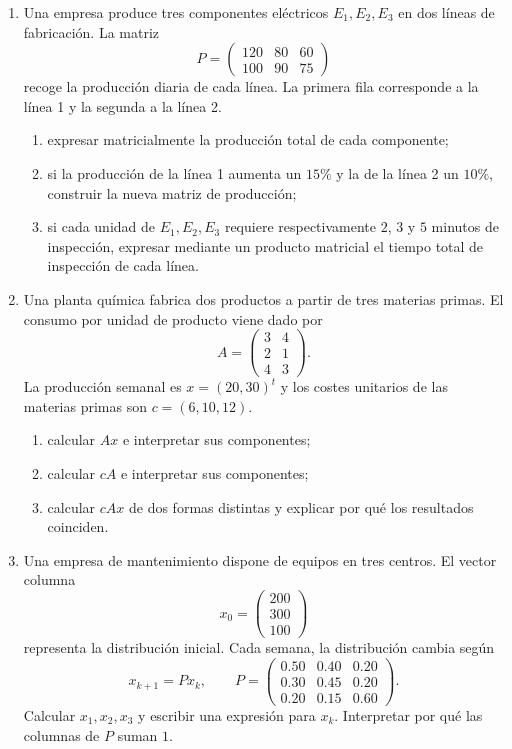 \begin{enumerate}[label=\textbf{\arabic*.},leftmargin=*]
\item Una empresa produce tres componentes eléctricos $E_1,E_2,E_3$ en dos líneas de fabricación. La matriz
\[
P=\begin{pmatrix}
120&80&60\\
100&90&75
\end{pmatrix}
\]
recoge la producción diaria de cada línea. La primera fila corresponde a la línea 1 y la segunda a la línea 2.
\begin{enumerate}[label=\alph*)]
\item expresar matricialmente la producción total de cada componente;
\item si la producción de la línea 1 aumenta un $15\%$ y la de la línea 2 un $10\%$, construir la nueva matriz de producción;
\item si cada unidad de $E_1,E_2,E_3$ requiere respectivamente $2$, $3$ y $5$ minutos de inspección, expresar mediante un producto matricial el tiempo total de inspección de cada línea.
\end{enumerate}

\item Una planta química fabrica dos productos a partir de tres materias primas. El consumo por unidad de producto viene dado por
\[
A=\begin{pmatrix}3&4\\2&1\\4&3\end{pmatrix}.
\]
La producción semanal es $x=(20,30)^t$ y los costes unitarios de las materias primas son $c=(6,10,12)$.
\begin{enumerate}[label=\alph*)]
\item calcular $Ax$ e interpretar sus componentes;
\item calcular $cA$ e interpretar sus componentes;
\item calcular $cAx$ de dos formas distintas y explicar por qué los resultados coinciden.
\end{enumerate}

\item Una empresa de mantenimiento dispone de equipos en tres centros. El vector columna
\[
x_0=\begin{pmatrix}200\\300\\100\end{pmatrix}
\]
representa la distribución inicial. Cada semana, la distribución cambia según
\[
x_{k+1}=Px_k,
\qquad
P=\begin{pmatrix}
0.50&0.40&0.20\\
0.30&0.45&0.20\\
0.20&0.15&0.60
\end{pmatrix}.
\]
Calcular $x_1,x_2,x_3$ y escribir una expresión para $x_k$. Interpretar por qué las columnas de $P$ suman $1$.


\end{enumerate}
